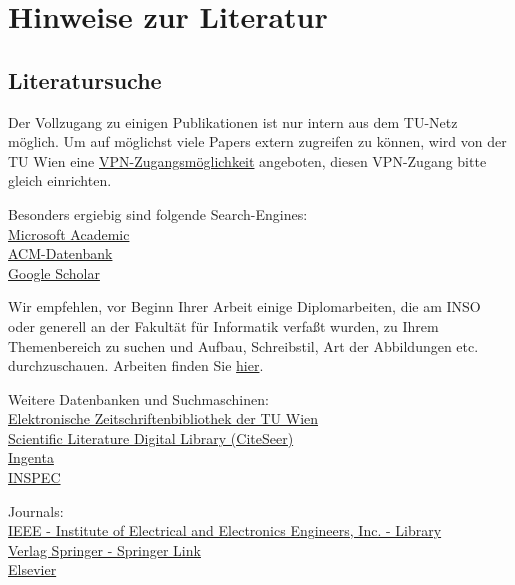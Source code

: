 \chapter{Hinweise zur Literatur}
\label{sec:references}

\section{Literatursuche}

Der Vollzugang zu einigen Publikationen ist nur intern aus dem TU-Netz möglich. Um auf möglichst viele Papers extern zugreifen zu können, wird von der TU Wien eine \href{http://www.zid.tuwien.ac.at/tunet/vpn/extern/}{VPN-Zugangsmöglichkeit} angeboten, diesen VPN-Zugang bitte gleich einrichten.

Besonders ergiebig sind folgende Search-Engines:\\
\href{http://academic.research.microsoft.com/}{Microsoft Academic}\\
\href{http://dl.acm.org/}{ACM-Datenbank}\\
\href{http://scholar.google.com/}{Google Scholar}

Wir empfehlen, vor Beginn Ihrer Arbeit einige Diplomarbeiten, die am INSO oder generell an der Fakultät für Informatik verfaßt wurden, zu Ihrem Themenbereich zu suchen und Aufbau, Schreibstil, Art der Abbildungen etc. durchzuschauen. Arbeiten finden Sie \href{http://media.obvsg.at/tuw?query=grechenig&metaname=swishdefault&submit=Suche+starten&sbm=tuw*&lbm=*&lbc=*&searchtype=sim&.cgifields=metaname}{hier}.

Weitere Datenbanken und Suchmaschinen:\\
\href{http://rzblx1.uni-regensburg.de/ezeit/search.phtml?bibid=UBTUW&colors=7&lang=de}{Elektronische Zeitschriftenbibliothek der TU Wien}\\
\href{http://citeseer.ist.psu.edu/index;jsessionid=BF9BD5A89D42210F60E5CA88B40BAD9C}{Scientific Literature Digital Library (CiteSeer)}\\
\href{http://www.ingentaconnect.com/}{Ingenta}\\
\href{http://www.theiet.org/resources/inspec/}{INSPEC}

Journals:\\
\href{http://ieeexplore.ieee.org/}{IEEE - Institute of Electrical and Electronics Engineers, Inc. - Library}\\
\href{http://www.springerlink.com/?MUD=MP}{Verlag Springer - Springer Link}\\
\href{http://www.elsevier.com/wps/find/homepage.cws_home}{Elsevier}

